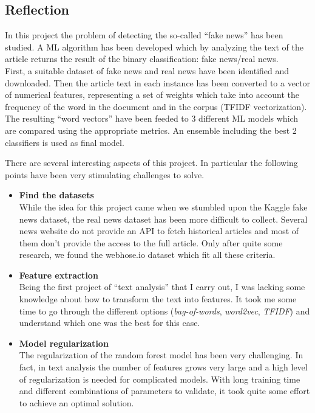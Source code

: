 \documentclass[a4paper,12pt]{article} %
\begin{document}
\subsection{Reflection}
\label{sec:reflection}
In this project the problem of detecting the so-called ``fake news'' has been studied.
A ML algorithm has been developed which by analyzing the text of the article
returns the result of the binary classification: fake news/real news. \\
First, a suitable dataset of fake news and real news have been identified and downloaded.
Then the article text in each instance has been converted to a vector of numerical features,
representing a set of weights which take into account the frequency of the word in the document and
in the corpus (TFIDF vectorization).
The resulting ``word vectors'' have been feeded to 3 different ML models which are
compared using the appropriate metrics.
An ensemble including the best 2 classifiers is used as final model.

There are several interesting aspects of this project.
In particular the following points have been very stimulating challenges to solve.

\begin{itemize}
\item \textbf{Find the datasets} \\
    While the idea for this project came when we stumbled upon the Kaggle fake news dataset,
    the real news dataset has been more difficult to collect.
    Several news website do not provide an API to fetch historical articles and most
    of them don't provide the access to the full article.
    Only after quite some research, we found the webhose.io dataset which fit all these criteria.
\item \textbf{Feature extraction} \\
    Being the first project of ``text analysis'' that I carry out,
    I was lacking some knowledge about how to transform the text into features.
    It took me some time to go through the different options (\textit{bag-of-words},
    \textit{word2vec}, \textit{TFIDF}) and understand which one was the best for this case.
\item \textbf{Model regularization} \\
    The regularization of the random forest model has been very challenging.
    In fact, in text analysis the number of features grows very large and a high
    level of regularization is needed for complicated models.
    With long training time and different combinations of parameters to validate,
    it took quite some effort to achieve an optimal solution.

\end{itemize}
\end{document}
